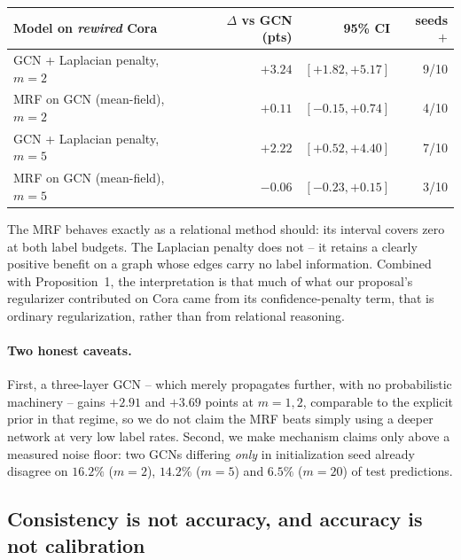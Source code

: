 \documentclass{article}
\begin{document}
\begin{center}
\small
\begin{tabular}{lrrr}
\toprule
Model on \emph{rewired} Cora & $\Delta$ vs GCN (pts) & 95\% CI & seeds $+$ \\
\midrule
GCN + Laplacian penalty, $m{=}2$ & $+3.24$ & $[+1.82,+5.17]$ & 9/10 \\
MRF on GCN (mean-field), $m{=}2$ & $+0.11$ & $[-0.15,+0.74]$ & 4/10 \\
GCN + Laplacian penalty, $m{=}5$ & $+2.22$ & $[+0.52,+4.40]$ & 7/10 \\
MRF on GCN (mean-field), $m{=}5$ & $-0.06$ & $[-0.23,+0.15]$ & 3/10 \\
\bottomrule
\end{tabular}
\end{center}

The MRF behaves exactly as a relational method should: its interval covers zero at both label
budgets. The Laplacian penalty does not -- it retains a clearly positive benefit on a graph whose
edges carry no label information. Combined with Proposition~1, the interpretation is that much of
what our proposal's regularizer contributed on Cora came from its confidence-penalty term, that
is ordinary regularization, rather than from relational reasoning.

\paragraph{Two honest caveats.} First, a three-layer GCN -- which merely propagates further, with
no probabilistic machinery -- gains $+2.91$ and $+3.69$ points at $m{=}1,2$, comparable to the
explicit prior in that regime, so we do not claim the MRF beats simply using a deeper network at
very low label rates. Second, we make mechanism claims only above a measured noise floor: two
GCNs differing \emph{only} in initialization seed already disagree on $16.2\%$ ($m{=}2$),
$14.2\%$ ($m{=}5$) and $6.5\%$ ($m{=}20$) of test predictions.

\subsection{Consistency is not accuracy, and accuracy is not calibration}
\label{sec:consistency}
\end{document}
